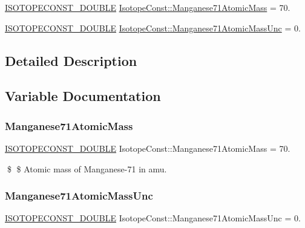 \begin{DoxyCompactItemize}
\item 
\mbox{\hyperlink{group___isotope_const-_macros_ga8f45a7272ce02c0b4c65c44636ed719a}{I\+S\+O\+T\+O\+P\+E\+C\+O\+N\+S\+T\+\_\+\+D\+O\+U\+B\+LE}} \mbox{\hyperlink{group___isotope_const-_manganese-_mn71_gad045af64402ae10edc02d816ede3c867}{Isotope\+Const\+::\+Manganese71\+Atomic\+Mass}} = 70.
\item 
\mbox{\hyperlink{group___isotope_const-_macros_ga8f45a7272ce02c0b4c65c44636ed719a}{I\+S\+O\+T\+O\+P\+E\+C\+O\+N\+S\+T\+\_\+\+D\+O\+U\+B\+LE}} \mbox{\hyperlink{group___isotope_const-_manganese-_mn71_ga5f22d4086979ab7b5866bf1d9edaff06}{Isotope\+Const\+::\+Manganese71\+Atomic\+Mass\+Unc}} = 0.
\end{DoxyCompactItemize}


\subsection{Detailed Description}


\subsection{Variable Documentation}
\mbox{\label{group___isotope_const-_manganese-_mn71_gad045af64402ae10edc02d816ede3c867}} 
\subsubsection{\texorpdfstring{Manganese71\+Atomic\+Mass}{Manganese71AtomicMass}}
{\footnotesize\ttfamily \mbox{\hyperlink{group___isotope_const-_macros_ga8f45a7272ce02c0b4c65c44636ed719a}{I\+S\+O\+T\+O\+P\+E\+C\+O\+N\+S\+T\+\_\+\+D\+O\+U\+B\+LE}} Isotope\+Const\+::\+Manganese71\+Atomic\+Mass = 70.}

\$ \$ Atomic mass of Manganese-\/71 in amu. \mbox{\label{group___isotope_const-_manganese-_mn71_ga5f22d4086979ab7b5866bf1d9edaff06}} 
\subsubsection{\texorpdfstring{Manganese71\+Atomic\+Mass\+Unc}{Manganese71AtomicMassUnc}}
{\footnotesize\ttfamily \mbox{\hyperlink{group___isotope_const-_macros_ga8f45a7272ce02c0b4c65c44636ed719a}{I\+S\+O\+T\+O\+P\+E\+C\+O\+N\+S\+T\+\_\+\+D\+O\+U\+B\+LE}} Isotope\+Const\+::\+Manganese71\+Atomic\+Mass\+Unc = 0.}

